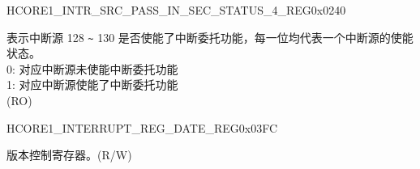 \begin{register}{H}{CORE1\_INTR\_SRC\_PASS\_IN\_SEC\_STATUS\_4\_REG}{0x0240}\label{regdesc:CORE1INTRSRCPASSINSECSTATUS4REG}
%
\regnewline%
\begin{regdesc}\begin{reglist}
\label{fielddesc:CORE1INTRSRCPASSINSECSTATUS4}\item [CORE1\_INTR\_SRC\_PASS\_IN\_SEC\_STATUS\_4] 表示中断源 128 \verb+~+ 130 是否使能了中断委托功能，每一位均代表一个中断源的使能状态。\\
0: 对应中断源未使能中断委托功能\\
1: 对应中断源使能了中断委托功能\\
(RO)
\end{reglist}\end{regdesc}
\end{register}

\begin{register}{H}{CORE1\_INTERRUPT\_REG\_DATE\_REG}{0x03FC}\label{regdesc:CORE1INTERRUPTREGDATEREG}
%
%
\regnewline%
\begin{regdesc}\begin{reglist}
\label{fielddesc:CORE1INTERRUPTREGDATE}\item [CORE1\_INTERRUPT\_REG\_DATE] 版本控制寄存器。(R/W)
\end{reglist}\end{regdesc}
\end{register}

